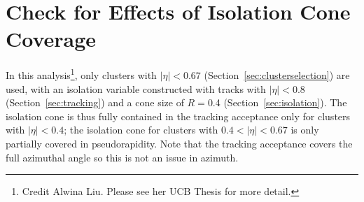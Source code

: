 


\section{Check for Effects of Isolation Cone Coverage}
\label{sec:iso_acceptance_check}

In this analysis\footnote{Credit Alwina Liu. Please see her UCB Thesis for more detail.}, only clusters with $|\eta|<0.67$ (Section~\ref{sec:clusterselection}) are used, with an isolation variable constructed with tracks with $|\eta|<0.8$ (Section~\ref{sec:tracking}) and a cone size of $R=$0.4 (Section~\ref{sec:isolation}). The isolation cone is thus fully contained in the tracking acceptance only for clusters with $|\eta|<0.4$; the isolation cone for clusters with $0.4<|\eta|<0.67$ is only partially covered in pseudorapidity. Note that the tracking acceptance covers the full azimuthal angle so this is not an issue in azimuth. 

